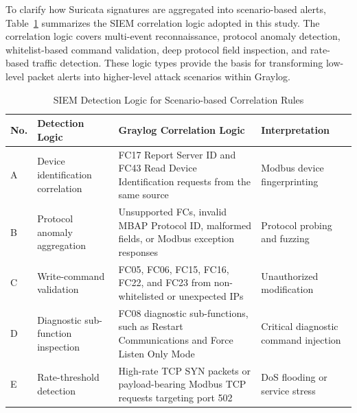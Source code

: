 To clarify how Suricata signatures are aggregated into scenario-based alerts, Table~\ref{tab:siem_correlation_logic} summarizes the SIEM correlation logic adopted in this study. The correlation logic covers multi-event reconnaissance, protocol anomaly detection, whitelist-based command validation, deep protocol field inspection, and rate-based traffic detection. These logic types provide the basis for transforming low-level packet alerts into higher-level attack scenarios within Graylog.
\begin{table}[H]
\caption{SIEM Detection Logic for Scenario-based Correlation Rules}
\centering
\small
\begin{tabularx}{\linewidth}{|l|>{\hsize=0.8\hsize}X|>{\hsize=1.4\hsize}X|>{\hsize=0.8\hsize}X|}
\hline
\textbf{No.} & \textbf{Detection Logic} & \textbf{Graylog Correlation Logic} & \textbf{Interpretation} \\
\hline
A & Device \newline identification \newline correlation 
& FC17 Report Server ID and FC43 Read Device Identification requests from the same source 
& Modbus device \newline fingerprinting \\
\hline
B & Protocol anomaly \newline aggregation 
& Unsupported FCs, invalid MBAP Protocol ID, malformed fields, or Modbus exception responses 
& Protocol probing \newline and fuzzing \\
\hline
C & Write-command \newline validation 
& FC05, FC06, FC15, FC16, FC22, and FC23 from \newline non-whitelisted or unexpected IPs 
& Unauthorized \newline modification \\
\hline
D & Diagnostic \newline sub-function \newline inspection 
& FC08 diagnostic sub-functions, such as Restart Communications and Force Listen Only Mode 
& Critical diagnostic \newline command injection \\
\hline
E & Rate-threshold \newline detection 
& High-rate TCP SYN packets or payload-bearing Modbus TCP requests targeting port 502 
& DoS flooding or \newline service stress \\
\hline
\end{tabularx}
\label{tab:siem_correlation_logic}
\end{table}







